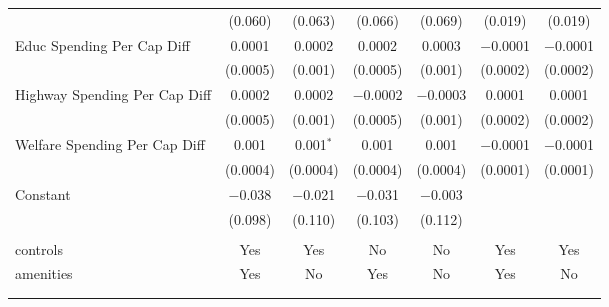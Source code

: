 \begin{table}[!htbp]
\begin{tabular}{@{\extracolsep{5pt}}lcccccc}
  & (0.060) & (0.063) & (0.066) & (0.069) & (0.019) & (0.019) \\ 
  Educ Spending Per Cap Diff & 0.0001 & 0.0002 & 0.0002 & 0.0003 & $-$0.0001 & $-$0.0001 \\ 
  & (0.0005) & (0.001) & (0.0005) & (0.001) & (0.0002) & (0.0002) \\ 
  Highway Spending Per Cap Diff & 0.0002 & 0.0002 & $-$0.0002 & $-$0.0003 & 0.0001 & 0.0001 \\ 
  & (0.0005) & (0.001) & (0.0005) & (0.001) & (0.0002) & (0.0002) \\ 
  Welfare Spending Per Cap Diff & 0.001 & 0.001$^{*}$ & 0.001 & 0.001 & $-$0.0001 & $-$0.0001 \\ 
  & (0.0004) & (0.0004) & (0.0004) & (0.0004) & (0.0001) & (0.0001) \\ 
  Constant & $-$0.038 & $-$0.021 & $-$0.031 & $-$0.003 &  &  \\ 
  & (0.098) & (0.110) & (0.103) & (0.112) &  &  \\ 
 \hline \\[-1.8ex] 
controls & Yes & Yes & No & No & Yes & Yes \\ 
amenities & Yes & No & Yes & No & Yes & No \\ 
\hline \\[-1.8ex] 
\hline 
\hline \\[-1.8ex] 
\end{tabular} 
\end{table} 
